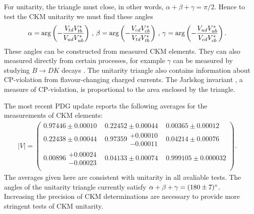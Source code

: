 For unitarity, the triangle must close, in other words, $\alpha+\beta+\gamma = \pi/2$. Hence to test the CKM unitarity we must find these angles
\begin{align}
  \alpha = \arg \left( -{V_{td}V_{tb}^*\over V_{ud}V_{ub}^*}\right) \,,\,
  \beta = \arg \left( -{V_{cd}V_{cb}^*\over V_{td}V_{tb}^*} \right) \,,\,
  \gamma = \arg \left( -{V_{ud}V_{ub}^*\over V_{cd}V_{cb}^*} \right).
\end{align}
These angles can be constructed from measured CKM elements. They can also measured directly from certain processes, for example $\gamma$ can be measured by studying $B\to DK$ decays \cite{GRONAU1991172,GRONAU1991483}. The unitarity triangle also contains information about CP-violation from flavour-changing charged currents. The Jarlskog invariant%
, a measure of CP-violation, is proportional to the area enclosed by the triangle.

The most recent PDG update \cite{PhysRevD.98.030001} reports the following averages for the measurements of CKM elements:
\begin{align}
  |V| = \begin{pmatrix}
    0.97446\pm 0.00010 & 0.22452\pm 0.00044 & 0.00365\pm 0.00012 \\
    0.22438\pm 0.00044 & 0.97359\substack{+0.00010\\-0.00011} & 0.04214\pm 0.00076 \\
    0.00896\substack{+0.00024\\-0.00023} & 0.04133\pm 0.00074 & 0.999105\pm 0.000032 \\
  \end{pmatrix}.
\end{align}
The averages given here are consistent with unitarity in all avaliable tests. %
The angles of the unitarity triangle currently satisfy $\alpha+\beta+\gamma = (180\pm 7)\degree$. Increasing the precision of CKM determinations are necessary to provide more stringent tests of CKM unitarity.

